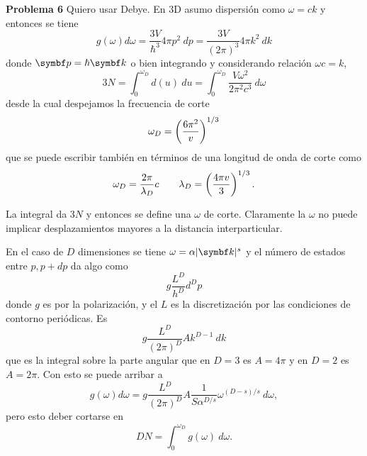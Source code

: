 \documentclass[10pt,oneside]{CBFT_book}
\begin{document}
\begin{ejemplo}{\bf Problema 6}
Quiero usar Debye. En 3D asumo dispersión como $ \omega = c k $  y entonces se tiene
\[
	g(\omega) d\omega = \frac{3V}{\hbar^3} 4 \pi p^2 \: dp = \frac{3V}{(2\pi)^3} 4 \pi k^2 \: dk
\]
donde $ \vb{p} = \hbar \vb{k} $ o bien integrando y considerando relación $ \omega c = k $,
\[
	3N = \int_0^{\omega_D} d(u) \: du = \int_0^{\omega_D} \frac{V \omega^2 }{2 \pi^2 c^3} \: d\omega
\]
desde la cual despejamos la frecuencia de corte
\[
	\omega_D = \left( \frac{  6 \pi^2  }{  v } \right)^{1/3}
\]
que se puede escribir también en términos de una longitud de onda de corte como
\[
	\omega_D = \frac{ 2 \pi }{\lambda_D} c \qquad  \lambda_D = \left( \frac{  4 \pi v  }{ 3 } \right)^{1/3}.
\]

La integral da $3N$ y entonces se define una $ \omega $ de corte. Claramente la $\omega$ no puede
implicar desplazamientos mayores a la distancia interparticular.

En el caso de $ D $ dimensiones se tiene $ \omega = \alpha |\vb{k}|^s$ y el número de estados entre
$p, p +dp$ da algo como
\[
	g \frac{L^D}{h^D} d^Dp
\]
donde $g$ es por la polarización, y el $L$ es la discretización por las condiciones de contorno periódicas.
Es
\[
	g \frac{ L^D }{ (2\pi)^D } A k^{D-1} \: dk
\]
que es la integral sobre la parte angular que en $D=3$ es $A=4\pi$ y en $D=2$ es $A=2\pi$.
Con esto se puede arribar a
\[
	g(\omega) d\omega = g \frac{ L^D }{ (2\pi)^D } A \frac{1}{S \alpha^{D/s}} \omega^{(D-s)/s} \: d\omega,
\]
pero esto deber cortarse en
\[
	DN = \int_0^{\omega_D} g(\omega) \: d\omega.
\]

\end{ejemplo}





\end{document}
